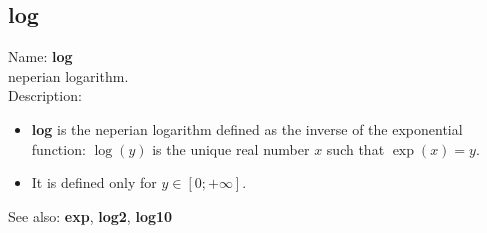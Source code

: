 \subsection{ log }
\noindent Name: \textbf{log}\\
neperian logarithm.\\

\noindent Description: \begin{itemize}

\item \textbf{log} is the neperian logarithm defined as the inverse of the exponential
   function: $\log(y)$ is the unique real number $x$ such that $\exp(x)=y$.

\item It is defined only for $y \in [0; +\infty]$.
\end{itemize}
See also: \textbf{exp}, \textbf{log2}, \textbf{log10}
